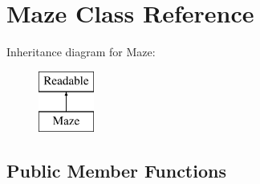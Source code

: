 \hypertarget{classMaze}{
\section{Maze Class Reference}
\label{classMaze}
}
Inheritance diagram for Maze:\begin{figure}[H]
\begin{center}
\leavevmode
\includegraphics[height=2.000000cm]{classMaze}
\end{center}
\end{figure}
\subsection*{Public Member Functions}
